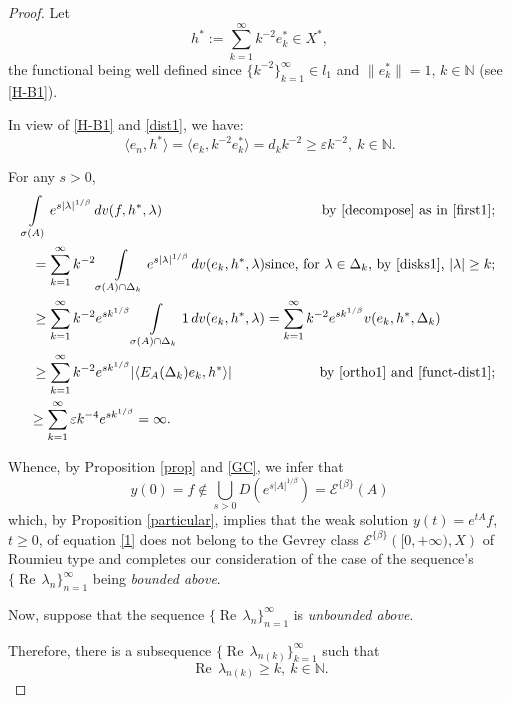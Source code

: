 \documentclass{amsart}
\theoremstyle{plain}
\theoremstyle{definition}
\begin{document}
\begin{proof}
Let
\begin{equation}\label{functional1}
h^*:=\sum_{k=1}^\infty k^{-2}e_k^*\in X^*,
\end{equation}
the functional being well defined since $\{k^{-2}\}_{k=1}^\infty\in l_1$ and $\|e_k^*\|=1$, $k\in{{\mathbb N}}$ (see \eqref{H-B1}).

In view of \eqref{H-B1} and \eqref{dist1}, we have:
\begin{equation}\label{funct-dist1}
\langle e_n,h^*\rangle=\langle e_k,k^{-2}e_k^*\rangle=d_k k^{-2}\ge \varepsilon k^{-2},\ k\in{{\mathbb N}}.
\end{equation}

For any $s>0$,
\begin{multline*}
\int\limits_{\sigma(A)}e^{s|\lambda|^{1/\beta}}\,dv(f,h^*,\lambda)
\hfill
\text{by \eqref{decompose} as in \eqref{first1};}
\\
\shoveleft{
=\sum_{k=1}^\infty k^{-2}\int\limits_{\sigma(A)\cap\Delta_k}e^{s|\lambda|^{1/\beta}}\,dv(e_k,h^*,\lambda)
\hfill
\text{since, for $\lambda\in \Delta_k$, by \eqref{disks1}, $|\lambda|\ge k$;}
}\\
\shoveleft{
\ge
\sum_{k=1}^\infty k^{-2}e^{sk^{1/\beta}}\int\limits_{\sigma(A)\cap\Delta_k}1\,dv(e_k,h^*,\lambda)
= \sum_{k=1}^\infty k^{-2}e^{sk^{1/\beta}} v(e_k,h^*,\Delta_k)
}\\
\shoveleft{
\ge\sum_{k=1}^\infty k^{-2}e^{sk^{1/\beta}}|\langle E_A(\Delta_k)e_k,h^*\rangle|
\hfill
\text{by \eqref{ortho1} and \eqref{funct-dist1};}
}\\
\ \
\ge \sum_{k=1}^\infty \varepsilon k^{-4}e^{sk^{1/\beta}}=\infty.
\hfill
\end{multline*} 

Whence, by Proposition \ref{prop} and \eqref{GC}, we infer that
\[
y(0)=f\notin \bigcup_{s>0} D(e^{s|A|^{1/\beta}})
={\mathscr E}^{\{\beta\}}(A)
\]
which, by Proposition \ref{particular}, implies that the weak solution $y(t)=e^{tA}f$, $t\ge 0$, 
of equation \eqref{1} does not belong to the 
Gevrey class ${\mathscr E}^{\{\beta \}}\left( [0,+\infty),X\right)$ of Roumieu
type and completes our consideration of the case of
the sequence's $\{\operatorname{Re\,}\lambda_n\}_{n=1}^\infty$ being \textit{bounded above}. 

Now, suppose that the sequence $\{\operatorname{Re\,}\lambda_n\}_{n=1}^\infty$
is \textit{unbounded above}. 

Therefore, there is a subsequence $\{\operatorname{Re\,}\lambda_{n(k)}\}_{k=1}^\infty$ such that
\begin{equation}\label{infinity}
\operatorname{Re\,}\lambda_{n(k)} \ge k,\ k\in{{\mathbb N}}.
\end{equation}


\end{proof}
\end{document}
